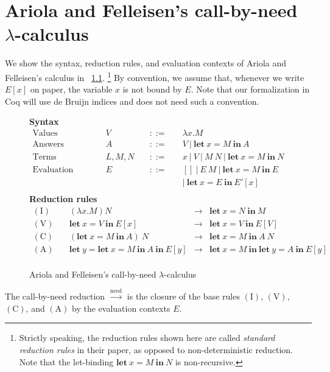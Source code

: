 \documentclass[english]{sumiilab-paper}
\newcommand{\LET}[3]{\mathbf{let}~#1=#2~\mathbf{in}~#3}
\newcommand{\CALLBYNEED}{\xrightarrow{\mathrm{need}}}
\begin{document}
\chapter{Ariola and Felleisen's call-by-need $\lambda$-calculus}\label{sec:call-by-need}
%
We show the syntax, reduction rules, and evaluation contexts of Ariola and Felleisen's calculus in \figurename~\ref{call-by-need-lambda-calculus}.%
\footnote{Strictly speaking, the reduction rules shown here are called \emph{standard reduction rules} in their paper, as opposed to non-deterministic reduction. Note that the let-binding $\LET{x}{M}{N}$ is non-recursive.}
By convention, we assume that, whenever we write $E[x]$ on paper, the variable $x$ is not bound by $E$.  Note that our formalization in Coq will use de Bruijn indices and does not need such a convention.
%
\begin{figure}[tp]
	\textbf{Syntax}
	\[ \begin{array}{llcl}
		\mbox{Values}\quad & V\quad & ::=\quad & \lambda x.M \\
		\mbox{Answers}\quad & A\quad & ::=\quad & V~|~\LET{x}{M}{A} \\
		\mbox{Terms}\quad & L,M,N\quad & ::=\quad & x~|~V~|~M~N~|~\LET{x}{M}{N} \\
		\mbox{Evaluation contexts}\quad & E\quad & ::=\quad & [] ~|~ E~M ~|~ \LET{x}{M}{E}\\
		& & & |~ \LET{x}{E}{E'[x]} \\
	\end{array} \]
	\textbf{Reduction rules}
	\[ \begin{array}{lrcl}
		(\mbox{I})\quad & (\lambda x.M)N & \rightarrow & \LET{x}{N}{M} \\
		(\mbox{V})\quad & \LET{x}{V}{E[x]} & \rightarrow & \LET{x}{V}{E[V]} \\
		(\mbox{C})\quad & (\LET{x}{M}{A})~N & \rightarrow & \LET{x}{M}{A~N} \\
		(\mbox{A})\quad & \LET{y}{\LET{x}{M}{A}}{E[y]} & \rightarrow & \LET{x}{M}{\LET{y}{A}{E[y]}} \\
	\end{array} \]
	\caption{Ariola and Felleisen's call-by-need $\lambda$-calculus}
	\label{call-by-need-lambda-calculus}
\end{figure}
%
The call-by-need reduction $\CALLBYNEED$ is the closure of the base rules $(\mbox{I})$, $(\mbox{V})$, $(\mbox{C})$, and $(\mbox{A})$ by the evaluation contexts $E$.
\end{document}
